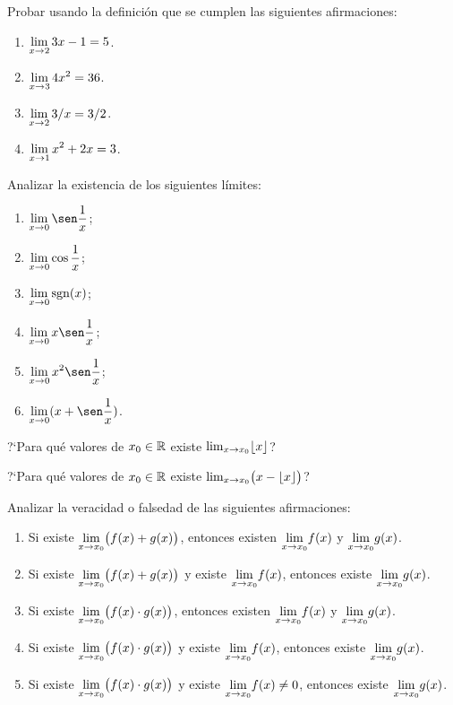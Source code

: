 \item Probar usando la definición que se cumplen las siguientes afirmaciones:

\begin{multicols}{2}
    \begin{enumerate}
        \item $\displaystyle \lim_{x\to 2} 3x-1=5 $.
        \item $\displaystyle \lim_{x\to 3} 4 x^2 = 36$.
        \item $\displaystyle \lim_{x\to 2} 3/x = 3/2$.
        \item $\displaystyle \lim_{x\to 1} x^2+2x = 3$.
    \end{enumerate}
\end{multicols}

\item Analizar la existencia de los siguientes límites:
\begin{multicols}{2}
    \begin{enumerate}
\item $\D \lim_{x\to 0} \sen \frac1x$;
\item $\displaystyle \lim_{x\to 0} \cos \frac1x$;
\item $\displaystyle \lim_{x\to 0} \operatorname{sgn}(x)$;
\item $\D \lim_{x\to 0} x \sen \frac1x$;
\item $\D \lim_{x\to 0} x^2 \sen \frac1x$;
\item $\D \lim_{x\to 0} (x + \sen \frac1x)$.
\end{enumerate}
\end{multicols}

\item ?`Para qué valores de $x_0\in\mathbb{R}$ existe ${\lim_{x\to x_0}} \lfloor x \rfloor$?

\item ?`Para qué valores de $x_0\in\mathbb{R}$ existe ${\lim_{x\to x_0}} \big(x - \lfloor x \rfloor\big)$?

\item Analizar la veracidad o falsedad de las siguientes afirmaciones:
\begin{enumerate}
    \item Si existe $\displaystyle{\ensuremath{\lim_{x\to x_0}}} \big(f(x)+g(x)\big)$, entonces existen
    $\displaystyle{\ensuremath{\lim_{x\to x_0}}} f(x)$ y $\displaystyle{\ensuremath{\lim_{x\to x_0}}} g(x)$.
    \item Si existe $\displaystyle{\ensuremath{\lim_{x\to x_0}}} \big(f(x)+g(x)\big)$ y existe
    $\displaystyle{\ensuremath{\lim_{x\to x_0}}} f(x)$, entonces existe $\displaystyle{\ensuremath{\lim_{x\to x_0}}} g(x)$.
    \item Si existe $\displaystyle{\ensuremath{\lim_{x\to x_0}}} \big(f(x)\cdot g(x)\big)$, entonces existen
    $\displaystyle{\ensuremath{\lim_{x\to x_0}}} f(x)$ y $\displaystyle{\ensuremath{\lim_{x\to x_0}}} g(x)$.
    \item Si existe $\displaystyle{\ensuremath{\lim_{x\to x_0}}} \big(f(x)\cdot g(x)\big)$ y existe
    $\displaystyle{\ensuremath{\lim_{x\to x_0}}} f(x)$, entonces existe $\displaystyle{\ensuremath{\lim_{x\to x_0}}} g(x)$.
    \item Si existe $\displaystyle{\ensuremath{\lim_{x\to x_0}}} \big(f(x)\cdot g(x)\big)$ y existe
    $\displaystyle{\ensuremath{\lim_{x\to x_0}}} f(x)\neq 0$, entonces existe $\displaystyle{\ensuremath{\lim_{x\to x_0}}} g(x)$.
    
\end{enumerate}

